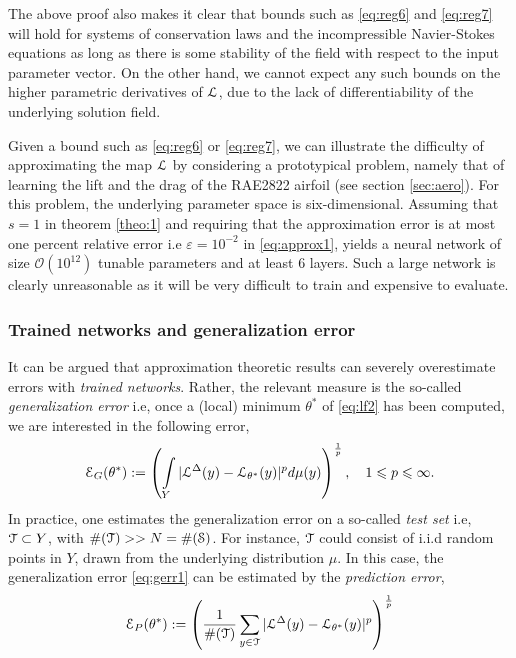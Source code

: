 \documentclass[a4paper]{article}
\numberwithin{equation}{section}
\numberwithin{equation}{section}
\theoremstyle{definition}
\theoremstyle{myremarkstyle}
\renewcommand{\leq}{\leqslant}
\renewcommand{\epsilon}{\varepsilon}
\newcommand{\cO}{{\mathcal O}}
\newcommand{\map}{\EuScript{L}}
\newcommand{\train}{\EuScript{S}}
\newcommand{\test}{\EuScript{T}}
\newcommand{\er}{\EuScript{E}}
\begin{document}
The above proof also makes it clear that bounds such as \eqref{eq:reg6} and \eqref{eq:reg7} will hold for systems of conservation laws and the incompressible Navier-Stokes equations as long as there is some stability of the field with respect to the input parameter vector. On the other hand, we cannot expect any such bounds on the higher parametric derivatives of $\map$, due to the lack of differentiability of the underlying solution field.

Given a bound such as \eqref{eq:reg6} or \eqref{eq:reg7}, we can illustrate the difficulty of approximating the map $\map$ by considering a prototypical problem, namely that of learning the lift and the drag of the RAE2822 airfoil (see section \ref{sec:aero}). For this problem, the underlying parameter space is six-dimensional. Assuming that $s=1$ in theorem \ref{theo:1} and requiring that the approximation error is at most one percent relative error i.e $\epsilon = 10^{-2}$ in \eqref{eq:approx1}, yields a neural network of size $\cO(10^{12})$ tunable parameters and at least $6$ layers. Such a large network is clearly unreasonable as it will be very difficult to train and expensive to evaluate. 
\subsubsection{Trained networks and generalization error}
\label{sec:gen}
It can be argued that approximation theoretic results can severely overestimate errors with \emph{trained networks}. Rather, the relevant measure is the so-called \emph{generalization error }i.e, once a (local) minimum $\theta^{\ast}$ of \eqref{eq:lf2} has been computed, we are interested in the following error,
\begin{equation}
\label{eq:gerr1}
\er_{G} (\theta^{\ast}) := \left(\int\limits_{Y} |\map^{\Delta}(y) - \map_{\theta^{\ast}}(y)|^p d\mu(y) \right)^{\frac{1}{p}}, \quad 1 \leq p \leq \infty.
\end{equation}
In practice, one estimates the generalization error on a so-called \emph{test set} i.e, $\test \subset Y$, with $\#(\test) >> N = \#(\train)$. For instance, $\test$ could consist of i.i.d random points in $Y$, drawn from the underlying distribution $\mu$. In this case, the generalization error \eqref{eq:gerr1} can be estimated by the \emph{prediction error},
 \begin{equation}
\label{eq:perr}
\er_{P} (\theta^{\ast}) : = \left(\frac{1}{\#(\test)}\sum\limits_{y \in \test} |\map^{\Delta}(y) - \map_{\theta^{\ast}} (y) |^p \right)^{\frac{1}{p}}
\end{equation}
\end{document}
